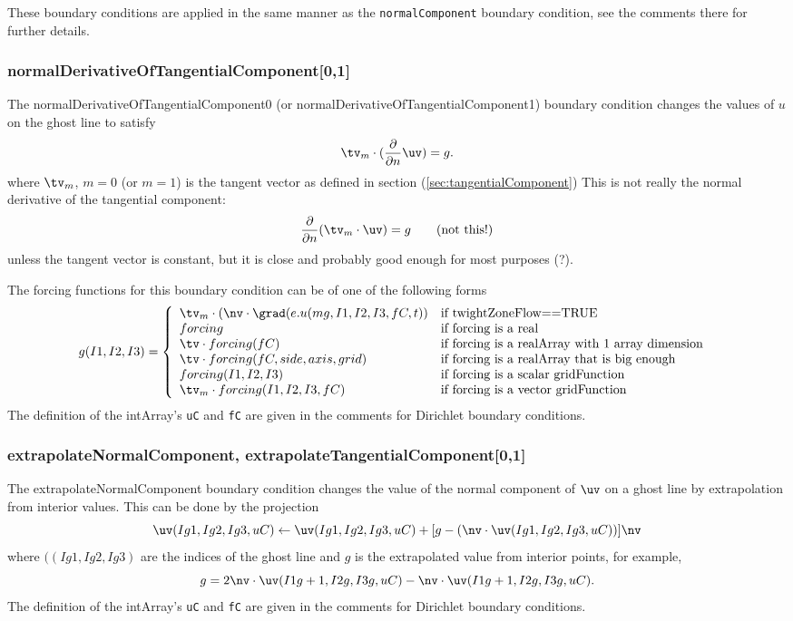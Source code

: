These boundary conditions are applied in the same manner as the {\tt normalComponent} boundary condition,
see the comments there for further details.


\subsubsection{normalDerivativeOfTangentialComponent[0,1]}

The {\ff normalDerivativeOfTangentialComponent0} (or {\ff normalDerivativeOfTangentialComponent1})
boundary condition changes the values of $u$ on the ghost line to satisfy 
\[
 \tv_m \cdot ({\partial \over\partial n} \uv) = g .
\]
where $\tv_m$, $m=0$ (or $m=1$) is the tangent vector as defined in section (\ref{sec:tangentialComponent})
This is not really the normal derivative of the tangential component:
\[
   {\partial \over\partial n} (\tv_m\cdot \uv) = g  \qquad \mbox{(not this!)}
\]
unless the tangent vector is constant, but it is close and probably good enough for most purposes (?).

The forcing functions for this boundary condition can be of one of the following forms
\[
 g(I1,I2,I3) =  \left\{ \begin{array}{ll}
        \tv_m \cdot( \nv\cdot\grad( \true u(mg,I1,I2,I3,fC,t) ) & \mbox{if twightZoneFlow==TRUE} \\
        forcing              & \mbox{if forcing is a real      } \\
    \tv\cdot forcing(fC)           & \mbox{if forcing  is a realArray with 1 array dimension } \\
    \tv\cdot forcing(fC,side,axis,grid) & \mbox{if forcing is a realArray that is big enough} \\
        forcing(I1,I2,I3)  & \mbox{if forcing is a scalar gridFunction} \\
        \tv_m \cdot forcing(I1,I2,I3,fC)  & \mbox{if forcing is a vector gridFunction} \\
          \end{array}
  \right.
\]
The definition of the intArray's {\tt uC} and {\tt fC} are given in the comments for Dirichlet boundary conditions.

\subsubsection{extrapolateNormalComponent, extrapolateTangentialComponent[0,1]}

The {\ff extrapolateNormalComponent} boundary condition changes the value 
of the normal component of $\uv$ on a ghost line by extrapolation from interior values.
This can be done by the projection
\[
        \uv(Ig1,Ig2,Ig3,uC) \leftarrow \uv(Ig1,Ig2,Ig3,uC) + [g-(\nv\cdot\uv(Ig1,Ig2,Ig3,uC))] \nv
\]
where $((Ig1,Ig2,Ig3)$ are the indices of the ghost line and
$g$ is the extrapolated value from interior points, for example,
\[
    g = 2 \nv\cdot\uv(I1g+1,I2g,I3g,uC) - \nv\cdot\uv(I1g+1,I2g,I3g,uC) .
\]
The definition of the intArray's {\tt uC} and {\tt fC} are given in the comments for Dirichlet boundary conditions.


